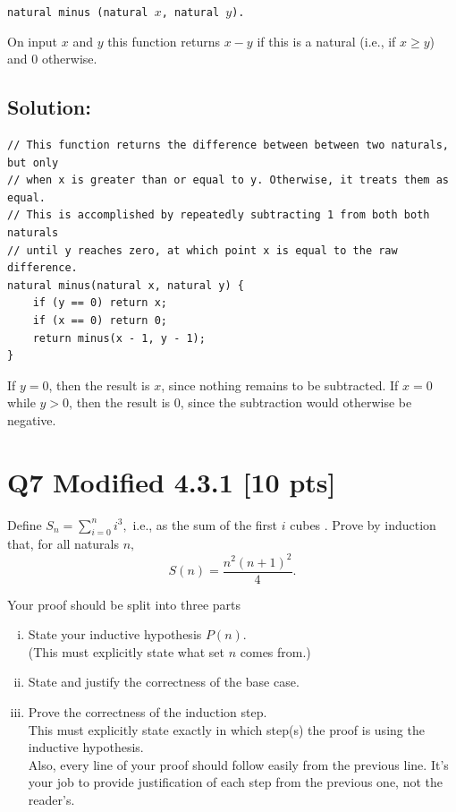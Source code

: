 \documentclass[12pt]{article}
\begin{document}
	\begin{center}
		\texttt{natural minus (natural $x$, natural $y$).}
	\end{center}
	On input $x$ and $y$ this function returns $x - y$ if this is a natural (i.e.,
	if $x \geq y$) and 0 otherwise.

	\subsection*{\textbf{Solution:}}

	\begin{verbatim}
// This function returns the difference between between two naturals, but only 
// when x is greater than or equal to y. Otherwise, it treats them as equal. 
// This is accomplished by repeatedly subtracting 1 from both both naturals 
// until y reaches zero, at which point x is equal to the raw difference.
natural minus(natural x, natural y) {
    if (y == 0) return x;
    if (x == 0) return 0;
    return minus(x - 1, y - 1);
}
\end{verbatim}
	If $y=0$, then the result is $x$, since nothing remains to be subtracted. If
	$x=0$ while $y>0$, then the result is $0$, since the subtraction would
	otherwise be negative.

	\newpage

	\section*{Q7 Modified 4.3.1 [10 pts]}

	Define $S_{n} = \sum_{i=0}^{n} i^{3},$ i.e., as the sum of the first $i$ cubes
	. Prove by induction that, for all naturals $n,$
	\begin{equation}
		S(n) = \frac{n^{2}(n+1)^{2}}{4}.
	\end{equation}

	Your proof should be split into three parts

	\begin{enumerate}[(i)]
		\item State your inductive hypothesis $P(n).$ \\
			(This must explicitly state what set $n$ comes from.)

		\item State and justify the correctness of the base case.

		\item Prove the correctness of the induction step. \\
			This must explicitly state exactly in which step(s) the proof is using the
			inductive hypothesis.\\
			Also, every line of your proof should follow easily from the previous line.
			It's your job to provide justification of each step from the previous one,
			not the reader's.
	\end{enumerate}
\end{document}
